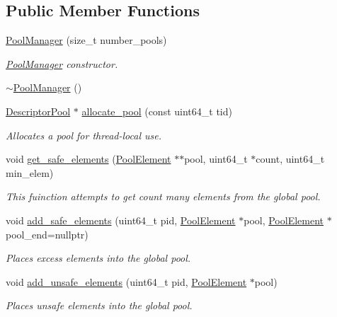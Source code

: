 \subsection*{Public Member Functions}
\begin{DoxyCompactItemize}
\item 
\hyperlink{classtervel_1_1util_1_1memory_1_1rc_1_1_pool_manager_aaedbc1e995ab876080fb098986b8afd2}{Pool\+Manager} (size\+\_\+t number\+\_\+pools)
\begin{DoxyCompactList}\small\item\em \hyperlink{classtervel_1_1util_1_1memory_1_1rc_1_1_pool_manager}{Pool\+Manager} constructor. \end{DoxyCompactList}\item 
\hyperlink{classtervel_1_1util_1_1memory_1_1rc_1_1_pool_manager_a6baac97ccf4070def8ce8c0fa4253400}{$\sim$\+Pool\+Manager} ()
\item 
\hyperlink{classtervel_1_1util_1_1memory_1_1rc_1_1_descriptor_pool}{Descriptor\+Pool} $\ast$ \hyperlink{classtervel_1_1util_1_1memory_1_1rc_1_1_pool_manager_a5c63d1bc7aa2e9d6583164b756d2b109}{allocate\+\_\+pool} (const uint64\+\_\+t tid)
\begin{DoxyCompactList}\small\item\em Allocates a pool for thread-\/local use. \end{DoxyCompactList}\item 
void \hyperlink{classtervel_1_1util_1_1memory_1_1rc_1_1_pool_manager_a8dc3f717f6c1e2f725bf634df86cd0fb}{get\+\_\+safe\+\_\+elements} (\hyperlink{classtervel_1_1util_1_1memory_1_1rc_1_1_pool_element}{Pool\+Element} $\ast$$\ast$pool, uint64\+\_\+t $\ast$count, uint64\+\_\+t min\+\_\+elem)
\begin{DoxyCompactList}\small\item\em This fuinction attempts to get \textquotesingle{}count\textquotesingle{} many elements from the global pool. \end{DoxyCompactList}\item 
void \hyperlink{classtervel_1_1util_1_1memory_1_1rc_1_1_pool_manager_a8c37fce16d20fc15c8db8e38b759041e}{add\+\_\+safe\+\_\+elements} (uint64\+\_\+t pid, \hyperlink{classtervel_1_1util_1_1memory_1_1rc_1_1_pool_element}{Pool\+Element} $\ast$pool, \hyperlink{classtervel_1_1util_1_1memory_1_1rc_1_1_pool_element}{Pool\+Element} $\ast$pool\+\_\+end=nullptr)
\begin{DoxyCompactList}\small\item\em Places excess elements into the global pool. \end{DoxyCompactList}\item 
void \hyperlink{classtervel_1_1util_1_1memory_1_1rc_1_1_pool_manager_a8c20264628d73217c0819ddac5964238}{add\+\_\+unsafe\+\_\+elements} (uint64\+\_\+t pid, \hyperlink{classtervel_1_1util_1_1memory_1_1rc_1_1_pool_element}{Pool\+Element} $\ast$pool)
\begin{DoxyCompactList}\small\item\em Places unsafe elements into the global pool. \end{DoxyCompactList}\end{DoxyCompactItemize}
